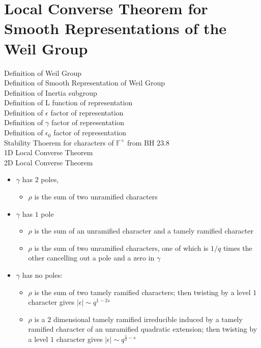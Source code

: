 \chapter{Local Converse Theorem for Smooth Representations of the Weil Group}	%
Definition of Weil Group \\
Definition of Smooth Representation of Weil Group \\
Definition of Inertia subgroup \\
Definition of L function of representation \\
Definition of $\epsilon$ factor of representation \\
Definition of $\gamma$ factor of representation \\
Definition of $\epsilon_0$ factor of representation \\
Stability Thoerem for characters of $\mathbb{F}^\times$ from BH 23.8\\
1D Local Converse Theorem \\
2D Local Converse Theorem \\
\begin{itemize}
\item $\gamma$ has $2$ poles, 
\begin{itemize} 
\item $\rho$ is the sum of two unramified characters
\end{itemize}
\item $\gamma$ has $1$ pole
\begin{itemize}
\item $\rho$ is the sum of an unramified character and a tamely ramified character
\item $\rho$ is the sum of two unramified characters, one of which is $1/q$ times the other cancelling out a pole and a zero in $\gamma$
\end{itemize}
\item $\gamma$ has no poles:
\begin{itemize}
\item $\rho$ is the sum of two tamely ramified characters; then twisting by a level $1$ character gives $|\epsilon| \sim q^{1-2s}$
\item $\rho$ is a $2$ dimensional tamely ramified irreducible induced by a tamely ramified character of an unramified quadratic extension; then twisting by a level $1$ character gives $|\epsilon| \sim q^{\frac{1}{2}-s}$
\end{itemize}
\end{itemize}
\endinput